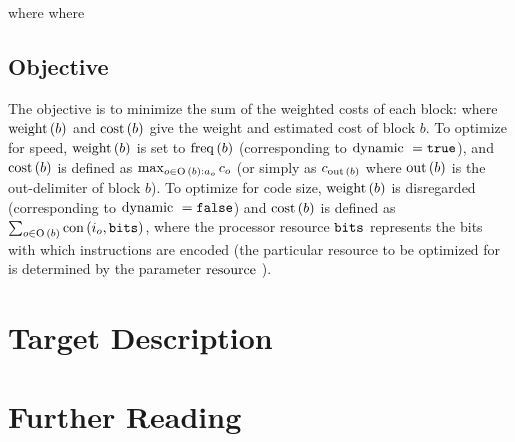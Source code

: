 \documentclass[11pt]{report}
\begin{document}
\liveStartEquation
{}
\liveEndEquation
{}
\dataPrecedencesEquation
where
\slackEquation
{}
\processorResourcesEquation
where
\blockOperationsEquation
{}
\fixedPrecedencesEquation
{}
\activationEquation
{}
\slackBalancingEquation

\section{Objective}

The objective is to minimize the sum of the weighted costs of each block:
%
\genericObjectiveEquation
%
where $\operatorname{weight}\,(b)$ and $\operatorname{cost}\,(b)$ give the weight and estimated cost
of block $b$.
%
To optimize for speed, $\operatorname{weight}\,(b)$ is set to $\operatorname{freq}\,(b)$
(corresponding to $\operatorname{dynamic}\,{}{} = \texttt{true}$), and $\operatorname{cost}\,(b)$ is
defined as $\max_{o \in \operatorname{O}\,(b) :
  a_{o}}{c_{o}}$ (or simply as
$c_{\operatorname{out}\,(b)}$ where $\operatorname{out}\,(b)$ is the
out-delimiter of block $b$).
%
To optimize for code size, $\operatorname{weight}\,(b)$ is disregarded (corresponding to
$\operatorname{dynamic}\,{}{} = \texttt{false}$) and $\operatorname{cost}\,(b)$ is defined as $\sum_{o
  \in \operatorname{O}\,(b)}{\operatorname{con}\,(i_{o}, \mathtt{bits}{})}$, where the
processor resource $\mathtt{bits}{}$ represents the bits with which instructions are
encoded (the particular resource to be optimized for is determined by the
parameter $\operatorname{resource}\,{}{}$).

\chapter{Target Description}
\label{sec:target-description}

\appendix

\chapter{Further Reading}
\label{sec:further-reading}
\end{document}
